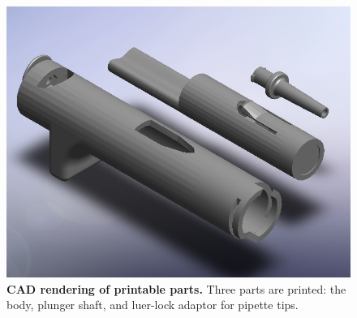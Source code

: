 \begin{figure}
\includegraphics[scale=0.4]{figure-images/rendering-assembly4.png} %
\caption{
{\bf CAD rendering of printable parts.}  Three parts are printed: the body, plunger shaft, and luer-lock adaptor for pipette tips.
}
\label{CAD-render-figure}
\end{figure}

